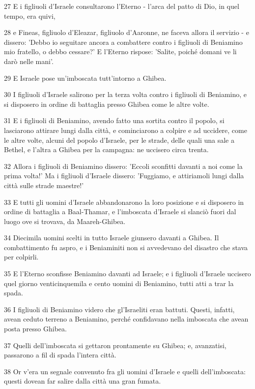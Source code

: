 \par 27 E i figliuoli d'Israele consultarono l'Eterno - l'arca del patto di Dio, in quel tempo, era quivi,
\par 28 e Fineas, figliuolo d'Eleazar, figliuolo d'Aaronne, ne faceva allora il servizio - e dissero: 'Debbo io seguitare ancora a combattere contro i figliuoli di Beniamino mio fratello, o debbo cessare?' E l'Eterno rispose: 'Salite, poiché domani ve li darò nelle mani'.
\par 29 E Israele pose un'imboscata tutt'intorno a Ghibea.
\par 30 I figliuoli d'Israele salirono per la terza volta contro i figliuoli di Beniamino, e si disposero in ordine di battaglia presso Ghibea come le altre volte.
\par 31 E i figliuoli di Beniamino, avendo fatto una sortita contro il popolo, si lasciarono attirare lungi dalla città, e cominciarono a colpire e ad uccidere, come le altre volte, alcuni del popolo d'Israele, per le strade, delle quali una sale a Bethel, e l'altra a Ghibea per la campagna: ne uccisero circa trenta.
\par 32 Allora i figliuoli di Beniamino dissero: 'Eccoli sconfitti davanti a noi come la prima volta!' Ma i figliuoli d'Israele dissero: 'Fuggiamo, e attiriamoli lungi dalla città sulle strade maestre!'
\par 33 E tutti gli uomini d'Israele abbandonarono la loro posizione e si disposero in ordine di battaglia a Baal-Thamar, e l'imboscata d'Israele si slanciò fuori dal luogo ove si trovava, da Maareh-Ghibea.
\par 34 Diecimila uomini scelti in tutto Israele giunsero davanti a Ghibea. Il combattimento fu aspro, e i Beniaminiti non si avvedevano del disastro che stava per colpirli.
\par 35 E l'Eterno sconfisse Beniamino davanti ad Israele; e i figliuoli d'Israele uccisero quel giorno venticinquemila e cento uomini di Beniamino, tutti atti a trar la spada.
\par 36 I figliuoli di Beniamino videro che gl'Israeliti eran battuti. Questi, infatti, avean ceduto terreno a Beniamino, perché confidavano nella imboscata che avean posta presso Ghibea.
\par 37 Quelli dell'imboscata si gettaron prontamente su Ghibea; e, avanzatisi, passarono a fil di spada l'intera città.
\par 38 Or v'era un segnale convenuto fra gli uomini d'Israele e quelli dell'imboscata: questi dovean far salire dalla città una gran fumata.
